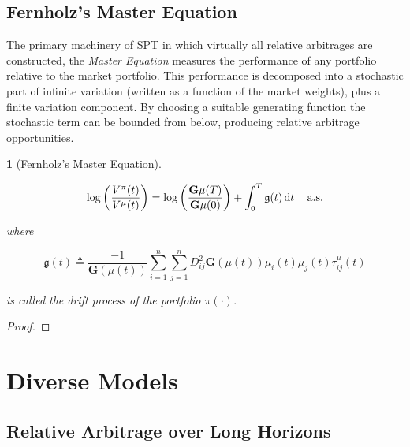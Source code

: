 \documentclass[british]{amsart} \usepackage{lmodern}
\numberwithin{equation}{section} \numberwithin{figure}{section}
\theoremstyle{plain} \newtheorem{thm}{\protect\theoremname}[section]
\theoremstyle{definition} \newtheorem{defn}[thm]{\protect\definitionname}
\theoremstyle{plain} \newtheorem{assumption}[thm]{\protect\assumptionname}
\theoremstyle{plain} \newtheorem{lem}[thm]{\protect\lemmaname}
\theoremstyle{plain} \newtheorem{prop}[thm]{\protect\propositionname}
\theoremstyle{remark} \newtheorem{rem}[thm]{\protect\remarkname}
\theoremstyle{plain} \newtheorem{cor}[thm]{\protect\corollaryname}
\renewcommand{\d}[1]{\mathop{\mathrm{d}{#1}}}
\begin{document}
\subsection{Fernholz's Master Equation}

The primary machinery of SPT in which virtually all relative arbitrages are constructed, the
\textit{Master Equation} measures the performance of any portfolio relative to
the market portfolio. This performance is decomposed into a stochastic part of
infinite variation (written as a function of the market weights), plus a
finite variation component. By choosing a suitable generating function the
stochastic term can be bounded from below, producing relative arbitrage
opportunities.

\begin{thm} [Fernholz's Master Equation]
  \label{thm:masterequation}

  \begin{equation}
    \log \left( \frac{V^{\pi}(t)}{V^{\mu}(t)} \right) = 
    \log \left( \frac{\mathbf{G}\mu(T)}{\mathbf{G}\mu(0)} \right) + 
      \int_{0}^{T} \mathfrak{g}(t)\d{t}
    \quad \almostsurely
  \end{equation}

  where 

  \begin{equation}
    \mathfrak{g}(t) \triangleq \frac{-1}{\mathbf{G}(\mu(t))}
        \sum_{i=1}^{n} \sum_{j=1}^{n} D_{ij}^{2} \mathbf{G}(\mu(t)) 
        \mu_{i}(t) \mu_{j}(t)
        \tau_{ij}^{\mu}(t)
  \end{equation}

  is called the \textit{drift process} of the portfolio $\pi(\cdot)$. 

\end{thm}

\begin{proof}

\end{proof}


\section{Diverse Models}

\subsection{Relative Arbitrage over Long Horizons}
\end{document}
